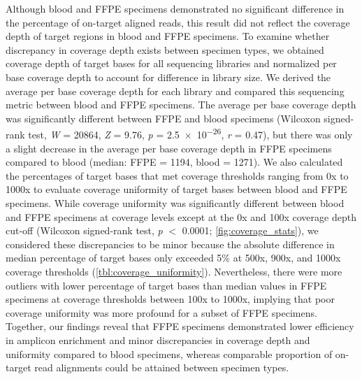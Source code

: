 Although blood and FFPE specimens demonstrated no significant difference in the percentage of on-target aligned reads, this result did not reflect the coverage depth of target regions in blood and FFPE specimens. To examine whether discrepancy in coverage depth exists between specimen types, we obtained coverage depth of target bases for all sequencing libraries and normalized per base coverage depth to account for difference in library size. We derived the average per base coverage depth for each library and compared this sequencing metric between blood and FFPE specimens. The average per base coverage depth was significantly different between FFPE and blood specimens (Wilcoxon signed-rank test, \textit{W} = \num{20864}, \textit{Z} = 9.76, \textit{p} = \num{2.5e-26}, \textit{r} = 0.47), but there was only a slight decrease in the average per base coverage depth in FFPE specimens compared to blood (median: FFPE = 1194, blood = 1271). We also calculated the percentages of target bases that met coverage thresholds ranging from 0x to 1000x to evaluate coverage uniformity of target bases between blood and FFPE specimens. While coverage uniformity was significantly different between blood and FFPE specimens at coverage levels except at the 0x and 100x coverage depth cut-off (Wilcoxon signed-rank test, \textit{p} $<$ \num{0.0001}; \autoref{fig:coverage_stats}), we considered these discrepancies to be minor because the absolute difference in median percentage of target bases only exceeded 5\% at 500x, 900x, and 1000x coverage thresholds (\autoref{tbl:coverage_uniformity}). Nevertheless, there were more outliers with lower percentage of target bases than median values in FFPE specimens at coverage thresholds between 100x to 1000x, implying that poor coverage uniformity was more profound for a subset of FFPE specimens. Together, our findings reveal that FFPE specimens demonstrated lower efficiency in amplicon enrichment and minor discrepancies in coverage depth and uniformity compared to blood specimens, whereas comparable proportion of on-target read alignments could be attained between specimen types.


